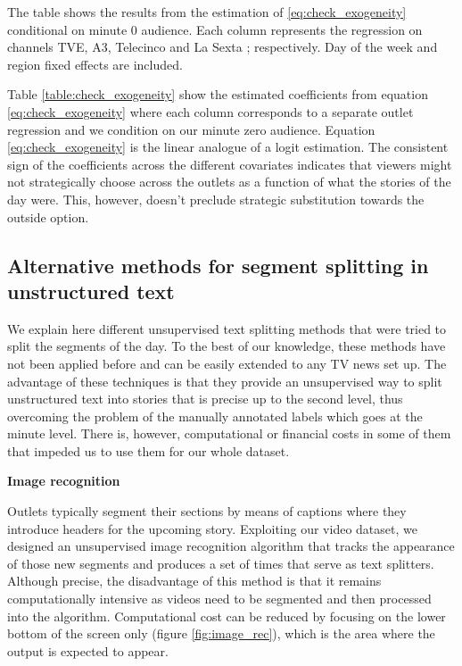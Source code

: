 \documentclass[12pt]{article}
\begin{document}
\begin{table}
	\centering

\caption{The table shows the results from the estimation of \ref{eq:check_exogeneity} conditional on minute 0 audience. Each column represents the regression on channels TVE, A3, Telecinco and La Sexta ; respectively. Day of the week and region fixed effects are included. }
\label{table:check_exogeneity}
\end{table}


Table \ref{table:check_exogeneity} show the estimated coefficients from equation \ref{eq:check_exogeneity} where each column corresponds to a separate outlet regression and we condition on our minute zero audience. Equation \ref{eq:check_exogeneity} is the linear analogue of a logit estimation. The consistent sign of the coefficients across the different covariates indicates that viewers might not strategically choose across the outlets as a function of what the stories of the day were. This, however, doesn't preclude strategic substitution towards the outside option. 





\subsection{Alternative methods for segment splitting in unstructured text}

We explain here different unsupervised text splitting methods that were tried to split the segments of the day. To the best of our knowledge, these methods have not been applied before and can be easily extended to any TV news set up. The advantage of these techniques is that they provide an unsupervised way to split unstructured text into stories that is precise up to the second level, thus overcoming the problem of the manually annotated labels which goes at the minute level. There is, however, computational or financial costs in some of them that impeded us to use them for our whole dataset.

\textbf{Image recognition}

Outlets typically segment their sections by means of captions where they introduce headers for the upcoming story. Exploiting our video dataset, we designed an unsupervised image recognition algorithm that tracks the appearance of those new segments and produces a set of times that serve as text splitters. Although precise, the disadvantage of this method is that it remains computationally intensive as videos need to be segmented and then processed into the algorithm. Computational cost can be reduced by focusing on the lower bottom of the screen  only (figure \ref{fig:image_rec}), which is the area where the output is expected to appear.
\end{document}
